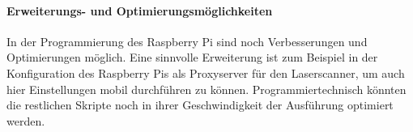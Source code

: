 \documentclass[a4paper,12pt,bibliography=totoc, listof=totoc,titlepage,pointlessnumbers]{scrreprt}
\begin{document}
\paragraph{Erweiterungs- und Optimierungsmöglichkeiten}
In der Programmierung des Raspberry Pi sind noch Verbesserungen und Optimierungen möglich. Eine sinnvolle Erweiterung ist zum Beispiel in der Konfiguration des Raspberry Pis als Proxyserver für den Laserscanner, um auch hier Einstellungen mobil durchführen zu können. Programmiertechnisch könnten die restlichen Skripte noch in ihrer Geschwindigkeit der Ausführung optimiert werden.




\renewcommand\UrlFont\itshape


\listoffigures
\listoftables
\end{document}
